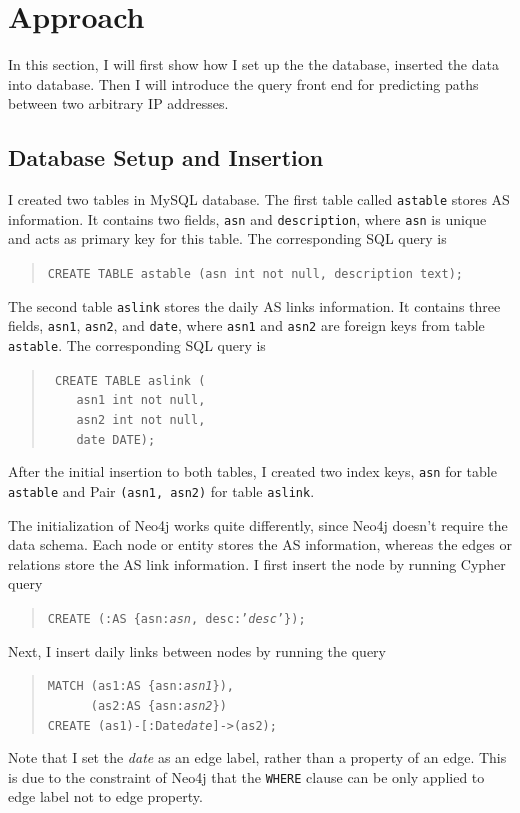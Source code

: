 \documentclass[letterpaper,twocolumn,11pt]{article}
\begin{document}
{\section{Approach}
In this section, I will first show how I set up the the database, inserted the data into database. Then I will introduce the query front end for predicting paths between two arbitrary IP addresses.

\subsection{Database Setup and Insertion}
I created two tables in MySQL database. The first table called \texttt{astable} stores AS information. It contains two fields, \texttt{asn} and \texttt{description}, where \texttt{asn} is unique and acts as primary key for this table. The corresponding SQL query is
\begin{quote}
\texttt{CREATE TABLE astable (asn int not null, description text);}
\end{quote}

The second table \texttt{aslink} stores the daily AS links information. It contains three fields, \texttt{asn1}, \texttt{asn2}, and \texttt{date}, where \texttt{asn1} and \texttt{asn2} are foreign keys from table {\tt astable}. The corresponding SQL query is
\begin{quote}
{\tt
CREATE TABLE aslink (\\
\-\ \ \ \ asn1 int not null, \\
\-\ \ \ \ asn2 int not null, \\
\-\ \ \ \ date DATE);
}
\end{quote}

After the initial insertion to both tables, I created two index keys, \texttt{asn} for table {\tt astable} and Pair {\tt (asn1, asn2)} for table {\tt aslink}.

The initialization of Neo4j works quite differently, since Neo4j doesn't require the data schema. Each node or entity stores the AS information, whereas the edges or relations store the AS link information. I first insert the node by running Cypher query
\begin{quote}
{\tt CREATE (:AS \{asn:{\it asn}, desc:'{\it desc}'\});}
\end{quote}
Next, I insert daily links between nodes by running the query
\begin{quote}
{\tt MATCH (as1:AS \{asn:{\it asn1}\}),\\
\-~~~~~~(as2:AS \{asn:{\it asn2}\}) \\
CREATE (as1)-[:Date{\it date}]->(as2);}
\end{quote}
Note that I set the {\it date} as an edge label, rather than a property of an edge. This is due to the constraint of Neo4j that the {\tt WHERE} clause can be only applied to edge label not to edge property. 

}
\end{document}
